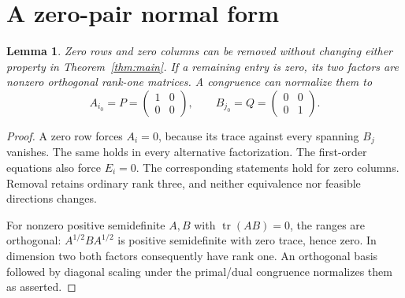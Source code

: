 \documentclass[11pt]{article}
\newtheorem{lemma}[theorem]{Lemma}
\newcommand{\tr}{\operatorname{tr}}
\begin{document}
\section{A zero-pair normal form}
\begin{lemma}\label{lem:zero}
Zero rows and zero columns can be removed without changing either property in Theorem~\ref{thm:main}. If a remaining entry is zero, its two factors are nonzero orthogonal rank-one matrices. A congruence can normalize them to
\[
 A_{i_0}=P=\begin{pmatrix}1&0\\0&0\end{pmatrix},\qquad
 B_{j_0}=Q=\begin{pmatrix}0&0\\0&1\end{pmatrix}.
\]
\end{lemma}
\begin{proof}
A zero row forces $A_i=0$, because its trace against every spanning $B_j$ vanishes. The same holds in every alternative factorization. The first-order equations also force $E_i=0$. The corresponding statements hold for zero columns. Removal retains ordinary rank three, and neither equivalence nor feasible directions changes.

For nonzero positive semidefinite $A,B$ with $\tr(AB)=0$, the ranges are orthogonal: $A^{1/2}BA^{1/2}$ is positive semidefinite with zero trace, hence zero. In dimension two both factors consequently have rank one. An orthogonal basis followed by diagonal scaling under the primal/dual congruence normalizes them as asserted.
\end{proof}
\end{document}
